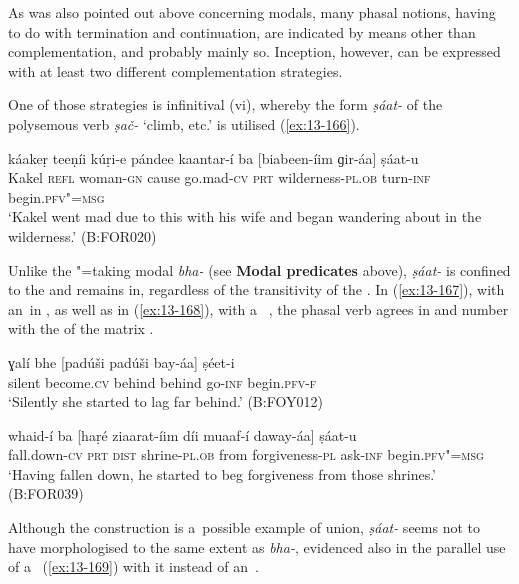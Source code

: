  As was also pointed out above concerning modals, many phasal notions, having to do with termination and continuation, are indicated by means other than complementation, and probably mainly so. Inception, however, can be expressed with at least two different complementation strategies.


One of those strategies is infinitival (vi), whereby the  form \textit{ṣáat-} of the polysemous verb \textit{ṣač-} `climb, etc.' is utilised (\ref{ex:13-166}). 

\begin{exe}
\ex
\label{ex:13-166}
\gll káakeṛ teeṇíi kúṛi-e pándee kaantar-í ba  [biabeen-íim ɡir-áa] ṣáat-u \\
Kakel \textsc{ refl} woman-\textsc{gn} cause go.mad-\textsc{cv} \textsc{prt}  wilderness-\textsc{pl.ob} turn-\textsc{inf} begin.\textsc{pfv"=msg} \\
\glt `Kakel went mad due to this with his wife and began wandering about in the wilderness.' (B:FOR020) 
\end{exe}

Unlike the "=taking modal \textit{bha-} (see \textbf{Modal predicates} above), \textit{ṣáat-} is confined to the  and remains in, regardless of the transitivity of the  . In (\ref{ex:13-167}), with an~in , as well as in (\ref{ex:13-168}), with a~ , the phasal verb agrees in  and number with the  of the matrix .

\begin{exe}
\ex
\label{ex:13-167}
\gll ɣalí bhe [padúši padúši bay-áa] ṣéet-i  \\
silent become.\textsc{cv} behind behind go-\textsc{inf} begin.\textsc{pfv-f} \\
\glt `Silently she started to lag far behind.' (B:FOY012)

\ex
\label{ex:13-168}
\gll whaid-í ba [haṛé ziaarat-íim díi  muaaf-í daway-áa] ṣáat-u \\
fall.down-\textsc{cv} \textsc{prt} \textsc{dist} shrine-\textsc{pl.ob} from forgiveness-\textsc{pl} ask-\textsc{inf} begin.\textsc{pfv"=msg}  \\
\glt `Having fallen down, he started to beg forgiveness from those shrines.' (B:FOR039) 
\end{exe}

Although the construction is a~possible example of  union, \textit{ṣáat-} seems not to have morphologised to the same extent as \textit{bha-}, evidenced also in the parallel use of a~ (\ref{ex:13-169}) with it instead of an~. 

